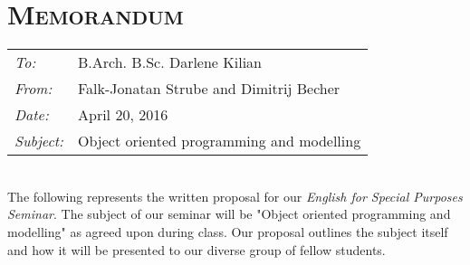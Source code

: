 
\renewcommand{\workingdir}{../../}



\DNotiz{}
\renewcommand{\Dokumentensignatur}{}




\chapter*{\textsc{Memorandum}}
\begin{tabular}{l l}
\emph{To:} & B.Arch. B.Sc. Darlene Kilian\\
\emph{From:} & Falk-Jonatan Strube and Dimitrij Becher\\
\emph{Date:} & April 20, 2016\\
\emph{Subject:} & Object oriented programming and modelling\\
\end{tabular}\medskip\\
The following represents the written proposal for our \emph{English for Special Purposes Seminar}. The subject of our seminar will be "Object oriented programming and modelling" as agreed upon during class. Our proposal outlines the subject itself and how it will be presented to our diverse group of fellow students. 

